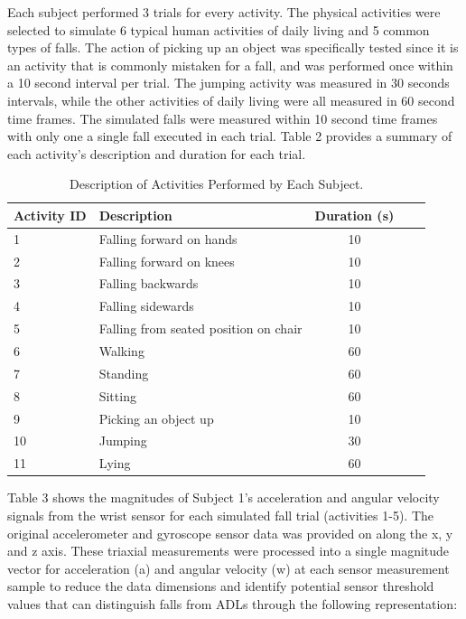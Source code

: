 \documentclass{llncs}
\begin{document}
	Each subject performed 3 trials for every activity. The physical activities were selected to simulate 6 typical human activities of daily living and 5 common types of falls. The action of picking up an object was specifically tested since it is an activity that is commonly mistaken for a fall, and was performed once within a 10 second interval per trial. The jumping activity was measured in 30 seconds intervals, while the other activities of daily living were all measured in 60 second time frames. The simulated falls were measured within 10 second time frames with only one a single fall executed in each trial. Table 2 provides a summary of each activity's description and duration for each trial.
	
\begin{table}
	\begin{center}
		\caption{Description of Activities Performed by Each Subject.}
		\label{table2}
		\begin{tabular}{llclr}
			\toprule
			Activity ID & Description & Duration (s)\\
			\midrule
			1 &  Falling forward on hands & 10\\
			2 &  Falling forward on knees & 10\\
			3 & Falling backwards & 10\\
			4 & Falling sidewards & 10\\
			5 & Falling from seated position on chair & 10\\
			6 & Walking & 60\\
			7 & Standing & 60\\
			8 & Sitting & 60\\
			9 & Picking an object up & 10\\
			10 & Jumping & 30\\
			11 & Lying & 60\\
			\bottomrule
		\end{tabular}
	\end{center}
\end{table}

	Table 3 shows the magnitudes of Subject 1's acceleration and angular velocity signals from the wrist sensor for each simulated fall trial (activities 1-5). The original accelerometer and gyroscope sensor data was provided on along the x, y and z axis. These triaxial measurements were processed into a single magnitude vector for acceleration (a) and angular velocity (w) at each sensor measurement sample to reduce the data dimensions and identify potential sensor threshold values that can distinguish falls from ADLs through the following representation:
	
\end{document}
